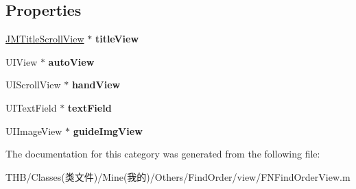 \subsection*{Properties}
\begin{DoxyCompactItemize}
\item 
\mbox{\label{category_f_n_find_order_view_07_08_ad10cdad202d571c2670a6c394a7a9084}} 
\mbox{\hyperlink{interface_j_m_title_scroll_view}{J\+M\+Title\+Scroll\+View}} $\ast$ {\bfseries title\+View}
\item 
\mbox{\label{category_f_n_find_order_view_07_08_a7346b0ad5117d1553c93410c711d91bf}} 
U\+I\+View $\ast$ {\bfseries auto\+View}
\item 
\mbox{\label{category_f_n_find_order_view_07_08_a920bc65de57eaa7df29b130405874105}} 
U\+I\+Scroll\+View $\ast$ {\bfseries hand\+View}
\item 
\mbox{\label{category_f_n_find_order_view_07_08_a8028c14ca607658d92b1ff41b7729f9d}} 
U\+I\+Text\+Field $\ast$ {\bfseries text\+Field}
\item 
\mbox{\label{category_f_n_find_order_view_07_08_a07ecadb9ff295757f7d3cc3ffb17b64c}} 
U\+I\+Image\+View $\ast$ {\bfseries guide\+Img\+View}
\end{DoxyCompactItemize}


The documentation for this category was generated from the following file\+:\begin{DoxyCompactItemize}
\item 
T\+H\+B/\+Classes(类文件)/\+Mine(我的)/\+Others/\+Find\+Order/view/F\+N\+Find\+Order\+View.\+m\end{DoxyCompactItemize}
